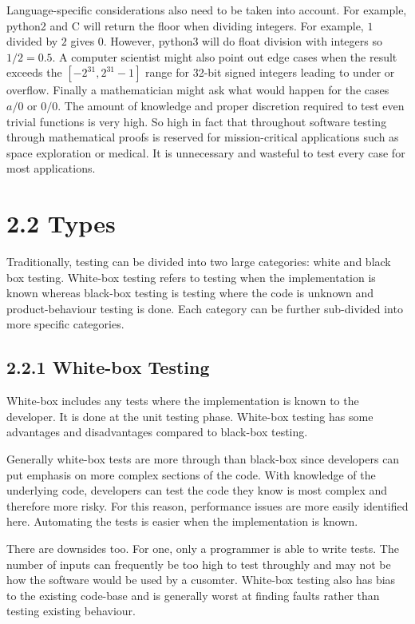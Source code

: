 \documentclass[12pt]{report}
\begin{document}
\par\noindent
Language-specific considerations also need to be taken into account. For example, python2 and C will return the floor when dividing integers. For example, $1$ divided by $2$ gives $0$. However, python3 will do float division with integers so $1 / 2 = 0.5$. A computer scientist might also point out edge cases when the result exceeds the $[-2^{31}, 2^{31}-1]$ range for 32-bit signed integers leading to under or overflow. Finally a mathematician might ask what would happen for the cases $a/0$ or $0/0$. The amount of knowledge and proper discretion required to test even trivial functions is very high. So high in fact that throughout software testing through mathematical proofs is reserved for mission-critical applications such as space exploration or medical. It is unnecessary and wasteful to test every case for most applications.

\section*{2.2 Types}

Traditionally, testing can be divided into two large categories: white and black box testing. White-box testing refers to testing when the implementation is known whereas black-box testing is testing where the code is unknown and product-behaviour testing is done. Each category can be further sub-divided into more specific categories.

\subsection*{2.2.1 White-box Testing}
\par\noindent
White-box includes any tests where the implementation is known to the developer. It is done at the unit testing phase. White-box testing has some advantages and disadvantages compared to black-box testing. 

\par\noindent
Generally white-box tests are more through than black-box since developers can put emphasis on more complex sections of the code. With knowledge of the underlying code, developers can test the code they know is most complex and therefore more risky. For this reason, performance issues are more easily identified here. Automating the tests is easier when the implementation is known.

\par\noindent
There are downsides too. For one, only a programmer is able to write tests. The number of inputs can frequently be too high to test throughly and may not be how the software would be used by a cusomter. White-box testing also has bias to the existing code-base and is generally worst at finding faults rather than testing existing behaviour.
\end{document}
